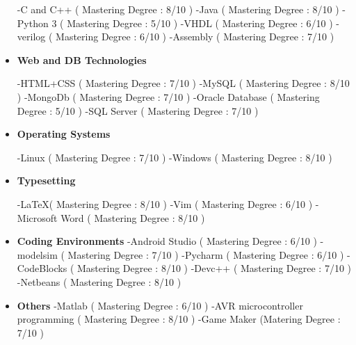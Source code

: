 \documentclass[letterpaper,MMMyyyy,nonstopmode]{simpleresumecv}
\begin{document}
\begin{Body}
\begin{itemize}
    -C and C++ \hfill ( Mastering Degree : 8/10 )
	\newline -Java  \hfill ( Mastering Degree : 8/10 )
    \newline  -Python 3 \hfill( Mastering Degree : 5/10 )
    \newline  -VHDL \hfill( Mastering Degree : 6/10 )
    \newline  -verilog \hfill( Mastering Degree : 6/10 )
    \newline  -Assembly \hfill( Mastering Degree : 7/10 )

\item{\textbf{Web and DB Technologies}}

     -HTML+CSS \hfill ( Mastering Degree : 7/10 )
	\newline -MySQL   \hfill ( Mastering Degree : 8/10 )
    \newline  -MongoDb \hfill( Mastering Degree : 7/10 )
    \newline  -Oracle Database \hfill( Mastering Degree : 5/10 )
    \newline -SQL Server \hfill ( Mastering Degree : 7/10 )


\item{\textbf{Operating Systems}}

     -Linux \hfill ( Mastering Degree : 7/10 )
	\newline -Windows   \hfill ( Mastering Degree : 8/10 )

\newpage
\item{\textbf{Typesetting}}

     -\LaTeX \hfill ( Mastering Degree : 8/10 )
	\newline -Vim  \hfill ( Mastering Degree : 6/10 )
	\newline -Microsoft Word  \hfill ( Mastering Degree : 8/10 )

\item{\textbf{Coding Environments}}
    \newline -Android Studio \hfill ( Mastering Degree : 6/10 )
    \newline -modelsim  \hfill ( Mastering Degree : 7/10 )
	\newline -Pycharm  \hfill ( Mastering Degree : 6/10 )
	\newline -CodeBlocks  \hfill ( Mastering Degree : 8/10 )
	\newline -Devc++  \hfill ( Mastering Degree : 7/10 )
	\newline -Netbeans  \hfill ( Mastering Degree : 8/10 )


\item{\textbf{Others}}
	\newline -Matlab  \hfill ( Mastering Degree : 6/10 )
	\newline -AVR microcontroller programming \hfill ( Mastering Degree : 8/10 )
	\newline -Game Maker \hfill (Matering Degree : 7/10 ) 



\end{itemize}
\end{Body}
\end{document}
